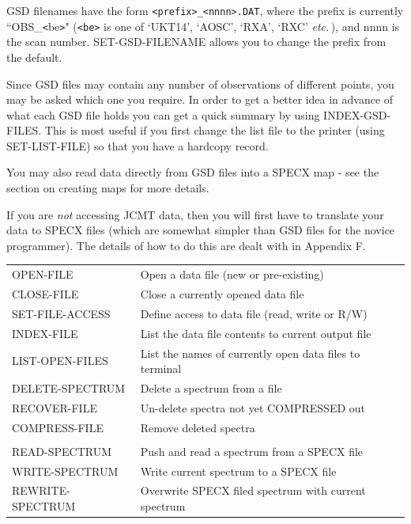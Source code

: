\documentclass[11pt,twoside]{report}
\newcommand{\etc}{{\it etc.\,}}
\begin{document}
GSD filenames have the form \verb+<prefix>_<nnnn>.DAT+, where the
prefix is currently ``OBS\_\verb+<+be\verb+>+"  (\verb+<be>+ is one of
`UKT14', `AOSC', `RXA', `RXC' \etc), and nnnn is the scan number.
SET-GSD-FILENAME allows you to change the prefix from the default. 

Since GSD files may contain any number of observations of
different points, you may be asked which one you require. In order to get a
better idea in advance of what each GSD file holds you can get a quick summary
by using INDEX-GSD-FILES. This is most useful if you first change the list file
to the printer (using SET-LIST-FILE) so that you have a hardcopy record.

You may also read data directly from GSD files into a SPECX map - see the 
section on creating maps for more details.

If you are {\em not} accessing JCMT data, then you will first have to translate
your data to SPECX files (which are somewhat simpler than GSD files for the
novice programmer). The details of how to do this are dealt with in Appendix
F.

\begin{tabular}{ll}
OPEN-FILE              & Open a data file (new or pre-existing)\\
CLOSE-FILE             & Close a currently opened data file\\
SET-FILE-ACCESS        & Define access to data file (read, write or R/W)\\
INDEX-FILE             & List the data file contents to current output file\\
LIST-OPEN-FILES        & List the names of currently open data files to terminal\\
DELETE-SPECTRUM        & Delete a spectrum from a file\\
RECOVER-FILE           & Un-delete spectra not yet COMPRESSED out\\
COMPRESS-FILE          & Remove deleted spectra\\
\\
READ-SPECTRUM          & Push and read a spectrum from a SPECX file \\
WRITE-SPECTRUM         & Write current spectrum to a SPECX file\\
REWRITE-SPECTRUM       & Overwrite SPECX filed spectrum with current spectrum\\
\end{tabular}
\end{document}
